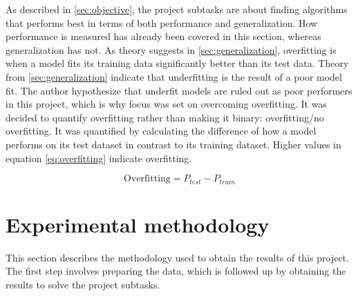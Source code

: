 	As described in \ref{sec:objective}, the project subtasks are about finding algorithms that performs best in terms of both performance and generalization. How performance is measured has already been covered in this section, whereas generalization has not. As theory suggests in \ref{sec:generalization}, overfitting is when a model fits its training data significantly better than its test data. Theory from \ref{sec:generalization} indicate that underfitting is the result of a poor model fit. The author hypothesize that underfit models are ruled out as poor performers in this project, which is why focus was set on overcoming overfitting. It was decided to quantify overfitting rather than making it binary: overfitting/no overfitting. It was quantified by calculating the difference of how a model performs on its test dataset in contrast to its training dataset. Higher values in equation \ref{eq:overfitting} indicate overfitting.

	\begin{equation} \label{eq:overfitting}
		\mbox{Overfitting} = P_{test} - P_{train}
	\end{equation}
	

\section{Experimental methodology}
	This section describes the methodology used to obtain the results of this project. The first step involves preparing the data, which is followed up by obtaining the results to solve the project subtasks. 

